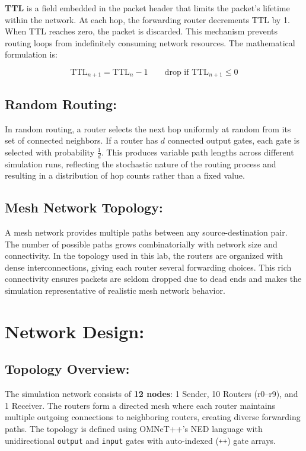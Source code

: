\documentclass[12pt,a4paper]{article}
\begin{document}
\justifying
\textbf{TTL} is a field embedded in the packet header that limits the packet's lifetime within the network. At each hop, the forwarding router decrements TTL by 1. When TTL reaches zero, the packet is discarded. This mechanism prevents routing loops from indefinitely consuming network resources. The mathematical formulation is:

\[
\text{TTL}_{n+1} = \text{TTL}_{n} - 1 \qquad \text{drop if } \text{TTL}_{n+1} \leq 0
\]

\subsection{Random Routing: }

\justifying
In random routing, a router selects the next hop uniformly at random from its set of connected neighbors. If a router has $d$ connected output gates, each gate is selected with probability $\frac{1}{d}$. This produces variable path lengths across different simulation runs, reflecting the stochastic nature of the routing process and resulting in a distribution of hop counts rather than a fixed value.

\subsection{Mesh Network Topology:}

\justifying
A mesh network provides multiple paths between any source-destination pair. The number of possible paths grows combinatorially with network size and connectivity. In the topology used in this lab, the routers are organized with dense interconnections, giving each router several forwarding choices. This rich connectivity ensures packets are seldom dropped due to dead ends and makes the simulation representative of realistic mesh network behavior.

\section{Network Design: }

\subsection{Topology Overview:}

\justifying
The simulation network consists of \textbf{12 nodes}: 1 Sender, 10 Routers (r0--r9), and 1 Receiver. The routers form a directed mesh where each router maintains multiple outgoing connections to neighboring routers, creating diverse forwarding paths. The topology is defined using OMNeT++'s NED language with unidirectional \texttt{output} and \texttt{input} gates with auto-indexed (\texttt{++}) gate arrays.
\end{document}
